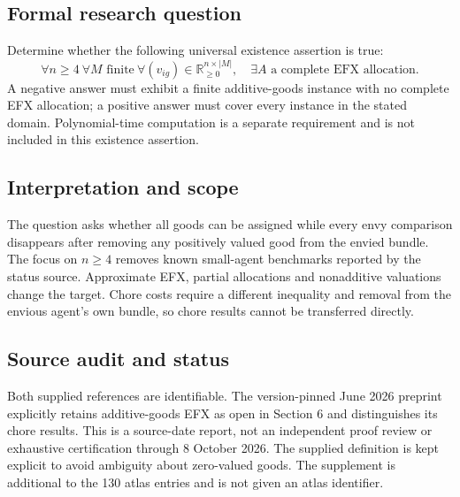 \documentclass[11pt,a4paper]{article}
\begin{document}
\subsection*{Formal research question}
Determine whether the following universal existence assertion is true:
\[
\forall n\geq4\ \forall M\text{ finite}\ \forall (v_{ig})\in\mathbb R_{\geq0}^{n\times|M|},
\quad \exists A\text{ a complete EFX allocation}.
\]
A negative answer must exhibit a finite additive-goods instance with no complete EFX allocation; a positive answer must cover every instance in the stated domain. Polynomial-time computation is a separate requirement and is not included in this existence assertion.
\subsection*{Interpretation and scope}
The question asks whether all goods can be assigned while every envy comparison disappears after removing any positively valued good from the envied bundle. The focus on $n\geq4$ removes known small-agent benchmarks reported by the status source. Approximate EFX, partial allocations and nonadditive valuations change the target. Chore costs require a different inequality and removal from the envious agent's own bundle, so chore results cannot be transferred directly.
\subsection*{Source audit and status}
Both supplied references are identifiable. The version-pinned June 2026 preprint explicitly retains additive-goods EFX as open in Section 6 and distinguishes its chore results. This is a source-date report, not an independent proof review or exhaustive certification through 8 October 2026. The supplied definition is kept explicit to avoid ambiguity about zero-valued goods. The supplement is additional to the 130 atlas entries and is not given an atlas identifier.
\end{document}
